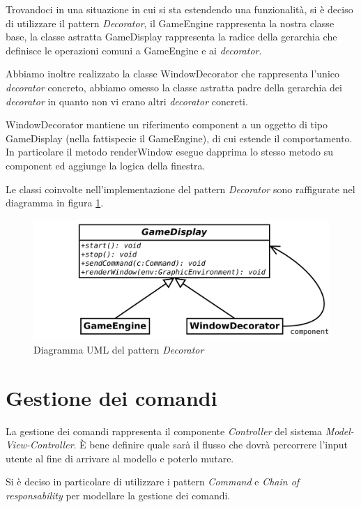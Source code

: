 \documentclass[a4paper,12pt]{article}
\begin{document}
Trovandoci in una situazione in cui si sta estendendo una funzionalit\`a, si \`e deciso di utilizzare il pattern \emph{Decorator}, il \textsf{GameEngine} rappresenta la nostra classe base, la classe astratta \textsf{GameDisplay} rappresenta la radice della gerarchia che definisce le operazioni comuni a \textsf{GameEngine} e ai \textit{decorator}.

Abbiamo inoltre realizzato la classe \textsf{WindowDecorator} che rappresenta l'unico \textit{decorator} concreto, abbiamo omesso la classe astratta padre della gerarchia dei \emph{decorator} in quanto non vi erano altri \emph{decorator} concreti.

\textsf{WindowDecorator} mantiene un riferimento \textsf{component} a un oggetto di tipo \textsf{GameDisplay} (nella fattispecie il \textsf{GameEngine}), di cui estende il comportamento. In particolare il metodo \textsf{renderWindow} esegue dapprima lo stesso metodo su \textsf{component} ed aggiunge la logica della finestra.

Le classi coinvolte nell'implementazione del pattern \emph{Decorator} sono raffigurate nel diagramma in figura \ref{img:Decorator}.

\begin{figure}[h]
\centering
\includegraphics[width=12cm]{Decorator.pdf}
\caption{Diagramma UML del pattern \emph{Decorator}}
\label{img:Decorator}
\end{figure}

\section{Gestione dei comandi}
\label{sec:comandi}

La gestione dei comandi rappresenta il componente \emph{Controller} del sistema \emph{Model-View-Controller}. \`E bene definire quale sar\`a il flusso che dovr\`a percorrere l'input utente al fine di arrivare al modello e poterlo mutare.

Si \`e deciso in particolare di utilizzare i pattern \emph{Command} e \emph{Chain of responsability} per modellare la gestione dei comandi.
\end{document}
